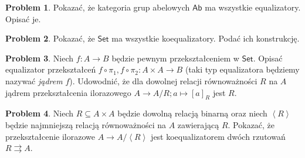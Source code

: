 \documentclass[10pt]{amsart}
\theoremstyle{plain}
\theoremstyle{definition}
\newtheorem{problem}{Problem}
\numberwithin{equation}{section}
\begin{document}
\begin{problem}
Pokazać, że kategoria grup abelowych $\mathsf{Ab}$ ma wszystkie equalizatory. Opisać je.  
\end{problem}

\begin{problem}
Pokazać, że $\mathsf{Set}$ ma wszystkie koequalizatory. Podać ich konstrukcję.
\end{problem}
\begin{problem}
Niech $f:A\to B$ będzie pewnym przekształceniem w $\mathsf{Set}$. Opisać equalizator przekształceń $f\circ \pi_1, f\circ \pi_2:A\times A\to B$ (taki typ equalizatora będziemy nazywać \emph{jądrem} $f$). Udowodnić, że dla dowolnej relacji równoważności $R$ na $A$ jądrem  przekształcenia ilorazowego $A\to A/R; a\mapsto [a]_R$ jest $R$.
\end{problem}
\begin{problem}
Niech $R\subseteq A\times A$ będzie dowolną relacją binarną oraz niech $\left < R\right >$ będzie najmniejszą relacją równoważności na $A$ zawierającą $R$. Pokazać, że przekształcenie ilorazowe $A\to A/\left < R \right >$ jest koequalizatorem dwóch rzutowań $R\rightrightarrows A$. 
\end{problem}
\end{document}
